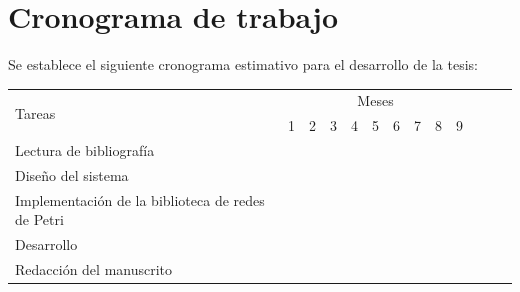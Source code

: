 \documentclass[12pt]{article}
\begin{document}
\section{Cronograma de trabajo}

Se establece el siguiente cronograma estimativo para el desarrollo de la tesis:

\bigskip

\begin{center}
    \def\arraystretch{1.5}
    \begin{tabular}{ |l|c|c|c|c|c|c|c|c|c|c|c|c| }

        \hline
        \multirow{2}{1em}{Tareas}                         & \multicolumn{9}{|c|}{Meses}                                                                                                                                                         \\  \cline{2-10} &
        1                                                 & 2                           & 3                & 4                & 5                & 6                & 7                & 8                & 9                                   \\  \hline
        Lectura de bibliografía                           & \cellcolor{gray}            & \cellcolor{gray} &                  &                  &                  &                  &                  &                  &                  \\
        \hline
        Diseño del sistema                                &                             & \cellcolor{gray} & \cellcolor{gray} &                  &                  &                  &                  &                  &                  \\
        \hline
        Implementación de la biblioteca de redes de Petri &                             & \cellcolor{gray} & \cellcolor{gray} & \cellcolor{gray} &                  &                  &                  &                  &                  \\
        \hline
        Desarrollo                                        &                             &                  &                  & \cellcolor{gray} & \cellcolor{gray} & \cellcolor{gray} & \cellcolor{gray} &                  &                  \\
        \hline
        Redacción del manuscrito                          &                             &                  &                  &                  &                  & \cellcolor{gray} & \cellcolor{gray} & \cellcolor{gray} & \cellcolor{gray} \\
        \hline
    \end{tabular}
\end{center}
\end{document}
